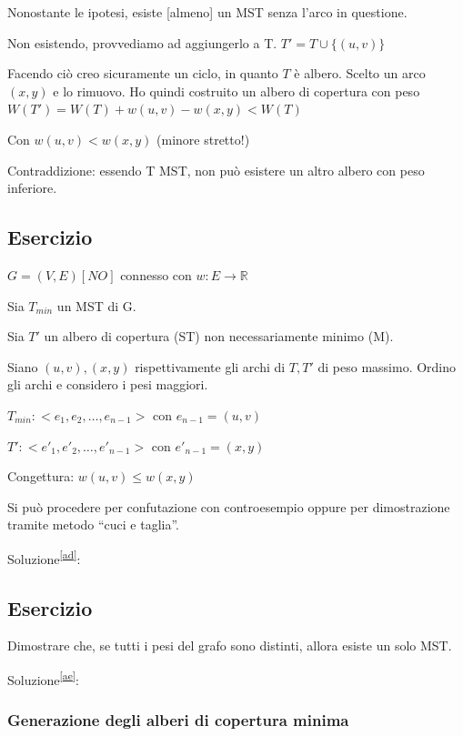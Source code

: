 \documentclass[11pt,a4paper,twoside,openright]{book}
\begin{document}
{{{Nonostante le ipotesi, esiste {[}almeno{]} un MST senza l'arco in
questione.}

{Non esistendo, provvediamo ad aggiungerlo a T. $T' = T \cup \{(u,v)\}$}

{Facendo ciò creo sicuramente un ciclo, in quanto $T$ è albero. Scelto un arco $(x,y)$ e lo rimuovo. Ho quindi costruito un albero di copertura con peso $W(T') = W(T) + w(u,v) - w(x,y) < W(T)$}

{Con $w(u,v) < w(x,y)$ (minore stretto!)}

{Contraddizione}{: essendo T MST, non può esistere un altro albero con peso inferiore.}

\subsection{Esercizio}

$G=(V,E) [NO]$ connesso con $w:E \rightarrow \mathbb{R}$

{Sia $T_{min}$ un MST di G.}

{Sia $T'$ un albero di copertura (ST) non necessariamente minimo (M).}

{Siano $(u,v),(x,y)$ rispettivamente gli archi di $T,T'$ di peso massimo. Ordino gli archi e considero i pesi maggiori.}

$T_{min}: <e_1,e_2,\ldots,e_{n-1}>$ con $e_{n-1} = (u,v)$

$T': <e'_1,e'_2,\ldots,e'_{n-1}>$ con $e'_{n-1} = (x,y)$

{Congettura: $w(u,v) \leq w(x,y)$}

{Si può procedere per confutazione con controesempio oppure per dimostrazione tramite metodo ``cuci e taglia''.}

{Soluzione}\textsuperscript{\protect\hyperlink{cmnt30}{{[}ad{]}}}{:}

\subsection{Esercizio}

{Dimostrare che, se tutti i pesi del grafo sono distinti, allora esiste un solo MST.}

{Soluzione}\textsuperscript{\protect\hyperlink{cmnt31}{{[}ae{]}}}{:}

\subsubsection{Generazione degli alberi di copertura minima}

}}
\end{document}
